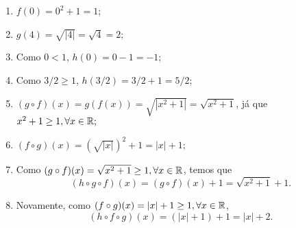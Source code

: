 \begin{enumerate}
	\item $f(0)=0^2+1=1$;
	\item $g(4)=\sqrt{|4|}=\sqrt{4}=2;$
	\item Como $0<1$, $h(0)=0-1=-1;$
	\item Como $3/2\geq 1$, $h(3/2)=3/2+1=5/2;$
	\item $(g\circ f)(x)=g(f(x))=\sqrt{|x^2+1|}=\sqrt{x^2+1}$, já que $x^2+1\geq 
1,\forall x\in\mathbb{R};$
	\item $(f\circ g)(x)=\left(\sqrt{|x|}\right)^2+1=|x|+1;$
	\item Como $(g\circ f)(x)=\sqrt{x^2+1}\geq 1,\forall x\in\mathbb{R}$, temos que
	\[
		(h\circ g\circ f)(x)=(g\circ f)(x)+1=\sqrt{x^2+1}+1.
	\]
	\item Novamente, como $(f\circ g)(x)=|x|+1\geq 1,\forall x\in\mathbb{R}$,
	\[
		(h\circ f\circ g)(x)=(|x|+1)+1=|x|+2.
	\]
\end{enumerate}
